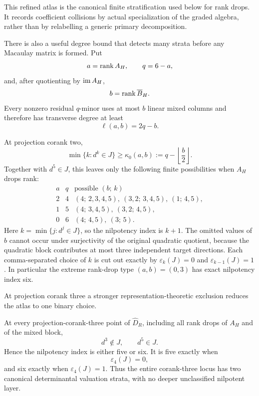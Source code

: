 This refined atlas is the canonical finite stratification used below
for rank drops.  It records coefficient collisions by actual
specialization of the graded algebra, rather than by relabelling a
generic primary decomposition.

There is also a useful degree bound that detects many strata before
any Macaulay matrix is formed.  Put
\[
 a=\operatorname{rank} A_H,\qquad q=6-a,
\]
and, after quotienting by \(\operatorname{im} A_H\),
\[
 b=\operatorname{rank}\overline B_H.
\]
Every nonzero residual \(q\)-minor uses at most \(b\) linear mixed
columns and therefore has transverse degree at least
\begin{equation}\label{eq:minimal-transverse-degree}
 \ell(a,b)=2q-b.
\end{equation}

\begin{proposition}
\label{prop:rankdrop-coranktwo-depth}
At projection corank two,
\begin{equation}\label{eq:coranktwo-lower-bound}
 \min\{k:d^k\in J\}\ge
 \kappa_0(a,b):=
 q-\left\lfloor\frac b2\right\rfloor.
\end{equation}
Together with \(d^5\in J\), this leaves only the following finite
possibilities when \(A_H\) drops rank:
\[
\begin{array}{c|c|c}
a&q&\text{possible }(b;\,k)\\ \hline
2&4&(4;\,2,3,4,5),\ (3,2;\,3,4,5),\ (1;\,4,5),\\
1&5&(4;\,3,4,5),\ (3,2;\,4,5),\\
0&6&(4;\,4,5),\ (3;\,5).
\end{array}
\]
Here \(k=\min\{j:d^j\in J\}\), so the nilpotency index is \(k+1\).
The omitted values of \(b\) cannot occur under surjectivity of the
original quadratic quotient, because the quadratic block contributes
at most three independent target directions.
Each comma-separated choice of \(k\) is cut out exactly by
\(\varepsilon_k(J)=0\) and
\(\varepsilon_{k-1}(J)=1\).
In particular the extreme rank-drop type \((a,b)=(0,3)\) has exact
nilpotency index six.
\end{proposition}

At projection corank three a stronger representation-theoretic
exclusion reduces the atlas to one binary choice.

\begin{theorem}
\label{thm:corank-three-depth}
At every projection-corank-three point of \(\widehat D_R\),
including all rank drops of \(A_H\) and of the mixed block,
\begin{equation}\label{eq:corank3-no-d3}
 d^3\notin J,\qquad d^5\in J.
\end{equation}
Hence the nilpotency index is either five or six.  It is five exactly
when
\[
 \varepsilon_4(J)=0,
\]
and six exactly when \(\varepsilon_4(J)=1\).
Thus the entire corank-three locus has two canonical determinantal
valuation strata, with no deeper unclassified nilpotent layer.
\end{theorem}

